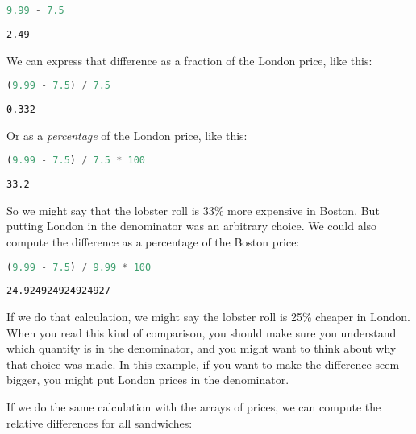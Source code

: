 \begin{lstlisting}[language=Python,style=source]
9.99 - 7.5
\end{lstlisting}

\begin{lstlisting}[style=output]
2.49
\end{lstlisting}

We can express that difference as a fraction of the London price, like
this:

\begin{lstlisting}[language=Python,style=source]
(9.99 - 7.5) / 7.5
\end{lstlisting}

\begin{lstlisting}[style=output]
0.332
\end{lstlisting}

Or as a \emph{percentage} of the London price, like this:

\begin{lstlisting}[language=Python,style=source]
(9.99 - 7.5) / 7.5 * 100
\end{lstlisting}

\begin{lstlisting}[style=output]
33.2
\end{lstlisting}

So we might say that the lobster roll is 33\% more expensive in Boston.
But putting London in the denominator was an arbitrary choice. We could
also compute the difference as a percentage of the Boston price:

\begin{lstlisting}[language=Python,style=source]
(9.99 - 7.5) / 9.99 * 100
\end{lstlisting}

\begin{lstlisting}[style=output]
24.924924924924927
\end{lstlisting}

If we do that calculation, we might say the lobster roll is 25\% cheaper
in London. When you read this kind of comparison, you should make sure
you understand which quantity is in the denominator, and you might want
to think about why that choice was made. In this example, if you want to
make the difference seem bigger, you might put London prices in the
denominator.

If we do the same calculation with the arrays of prices, we can compute
the relative differences for all sandwiches:

